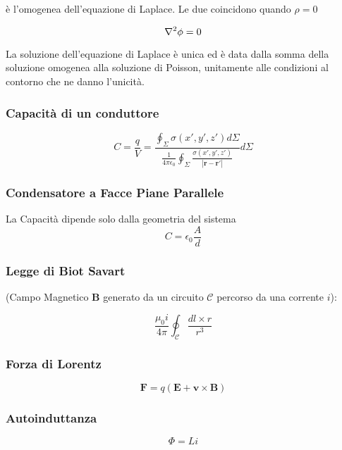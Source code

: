 \documentclass[a4paper]{scrarticle}
\begin{document}
è l'omogenea dell'equazione di Laplace. Le due coincidono quando $\rho = 0$

\begin{equation}
    \laplacian \phi = 0
\end{equation}

La soluzione dell'equazione di Laplace è unica ed è data dalla somma della soluzione omogenea alla soluzione di Poisson, unitamente alle condizioni al contorno che ne danno l'unicità.

\subsubsection*{Capacità di un conduttore}

\begin{equation}
    C = \frac{q}{V} = 
    \frac{\oint_\Sigma \sigma (x',y',z') d\Sigma}{\frac{1}{4\pi\epsilon_0} \oint_\Sigma \frac{\sigma(x',y',z')}{\left| \bm{r} - \bm{r'} \right|}} d\Sigma
\end{equation}

\subsubsection*{Condensatore a Facce Piane Parallele}
La Capacità dipende solo dalla geometria del sistema
\begin{equation*}
    C = \epsilon_0 \frac{A}{d}
\end{equation*}


\subsubsection*{Legge di Biot Savart} 
(Campo Magnetico $\bm B$  generato da un circuito $\mathcal{C}$ percorso da una corrente $i$):

\begin{equation}
    \frac{\mu_0 i}{4 \pi} \oint_{\mathcal{C}} \frac {dl \times r}{r^3}
\end{equation}

\subsubsection*{Forza di Lorentz}

\begin{equation}
   \bm F = q (\bm E + \bm v \times \bm B )
\end{equation}

\subsubsection*{Autoinduttanza}
\begin{equation}
    \varPhi = L i
\end{equation}
\end{document}
